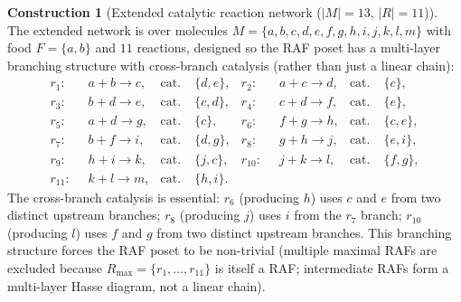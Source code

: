 \documentclass[11pt,a4paper]{article}
\theoremstyle{plain}
\theoremstyle{definition}
\newtheorem{construction}[theorem]{Construction}
\theoremstyle{remark}
\begin{document}
\begin{construction}[Extended catalytic reaction network ($|M|=13$,
$|R|=11$)]
\label{con:invlim-extended}
The extended network is over molecules
$M=\{a,b,c,d,e,f,g,h,i,j,k,l,m\}$ with food $F=\{a,b\}$ and $11$
reactions, designed so the RAF poset has a multi-layer branching
structure with cross-branch catalysis (rather than just a linear
chain):
\begin{equation}\label{eq:extended-rxn}
\begin{aligned}
  r_1:&\;\; a+b \to c, &\text{cat.}&\;\{d,e\}, &
  r_2:&\;\; a+c \to d, &\text{cat.}&\;\{c\}, \\
  r_3:&\;\; b+d \to e, &\text{cat.}&\;\{c,d\}, &
  r_4:&\;\; c+d \to f, &\text{cat.}&\;\{e\}, \\
  r_5:&\;\; a+d \to g, &\text{cat.}&\;\{c\}, &
  r_6:&\;\; f+g \to h, &\text{cat.}&\;\{c,e\}, \\
  r_7:&\;\; b+f \to i, &\text{cat.}&\;\{d,g\}, &
  r_8:&\;\; g+h \to j, &\text{cat.}&\;\{e,i\}, \\
  r_9:&\;\; h+i \to k, &\text{cat.}&\;\{j,c\}, &
  r_{10}:&\;\; j+k \to l, &\text{cat.}&\;\{f,g\}, \\
  r_{11}:&\;\; k+l \to m, &\text{cat.}&\;\{h,i\}. & &
\end{aligned}
\end{equation}
The cross-branch catalysis is essential: $r_6$ (producing $h$) uses
$c$ and $e$ from two distinct upstream branches; $r_8$ (producing
$j$) uses $i$ from the $r_7$ branch; $r_{10}$ (producing $l$) uses
$f$ and $g$ from two distinct upstream branches. This branching
structure forces the RAF poset to be non-trivial (multiple maximal
RAFs are excluded because $R_{\max}=\{r_1,\ldots,r_{11}\}$ is itself
a RAF; intermediate RAFs form a multi-layer Hasse diagram, not a
linear chain).
\end{construction}
\end{document}
